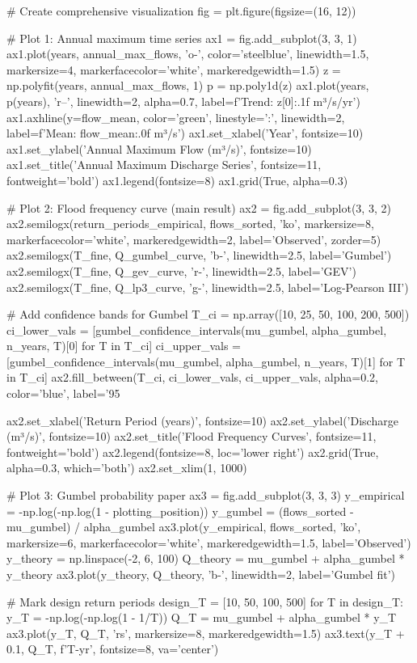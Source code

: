 \documentclass[a4paper, 11pt]{article}
\begin{document}
\begin{pycode}
# Create comprehensive visualization
fig = plt.figure(figsize=(16, 12))

# Plot 1: Annual maximum time series
ax1 = fig.add_subplot(3, 3, 1)
ax1.plot(years, annual_max_flows, 'o-', color='steelblue', linewidth=1.5,
         markersize=4, markerfacecolor='white', markeredgewidth=1.5)
z = np.polyfit(years, annual_max_flows, 1)
p = np.poly1d(z)
ax1.plot(years, p(years), 'r--', linewidth=2, alpha=0.7, label=f'Trend: {z[0]:.1f} m³/s/yr')
ax1.axhline(y=flow_mean, color='green', linestyle=':', linewidth=2, label=f'Mean: {flow_mean:.0f} m³/s')
ax1.set_xlabel('Year', fontsize=10)
ax1.set_ylabel('Annual Maximum Flow (m³/s)', fontsize=10)
ax1.set_title('Annual Maximum Discharge Series', fontsize=11, fontweight='bold')
ax1.legend(fontsize=8)
ax1.grid(True, alpha=0.3)

# Plot 2: Flood frequency curve (main result)
ax2 = fig.add_subplot(3, 3, 2)
ax2.semilogx(return_periods_empirical, flows_sorted, 'ko', markersize=8,
             markerfacecolor='white', markeredgewidth=2, label='Observed', zorder=5)
ax2.semilogx(T_fine, Q_gumbel_curve, 'b-', linewidth=2.5, label='Gumbel')
ax2.semilogx(T_fine, Q_gev_curve, 'r-', linewidth=2.5, label='GEV')
ax2.semilogx(T_fine, Q_lp3_curve, 'g-', linewidth=2.5, label='Log-Pearson III')

# Add confidence bands for Gumbel
T_ci = np.array([10, 25, 50, 100, 200, 500])
ci_lower_vals = [gumbel_confidence_intervals(mu_gumbel, alpha_gumbel, n_years, T)[0] for T in T_ci]
ci_upper_vals = [gumbel_confidence_intervals(mu_gumbel, alpha_gumbel, n_years, T)[1] for T in T_ci]
ax2.fill_between(T_ci, ci_lower_vals, ci_upper_vals, alpha=0.2, color='blue', label='95%

ax2.set_xlabel('Return Period (years)', fontsize=10)
ax2.set_ylabel('Discharge (m³/s)', fontsize=10)
ax2.set_title('Flood Frequency Curves', fontsize=11, fontweight='bold')
ax2.legend(fontsize=8, loc='lower right')
ax2.grid(True, alpha=0.3, which='both')
ax2.set_xlim(1, 1000)

# Plot 3: Gumbel probability paper
ax3 = fig.add_subplot(3, 3, 3)
y_empirical = -np.log(-np.log(1 - plotting_position))
y_gumbel = (flows_sorted - mu_gumbel) / alpha_gumbel
ax3.plot(y_empirical, flows_sorted, 'ko', markersize=6, markerfacecolor='white',
         markeredgewidth=1.5, label='Observed')
y_theory = np.linspace(-2, 6, 100)
Q_theory = mu_gumbel + alpha_gumbel * y_theory
ax3.plot(y_theory, Q_theory, 'b-', linewidth=2, label='Gumbel fit')

# Mark design return periods
design_T = [10, 50, 100, 500]
for T in design_T:
    y_T = -np.log(-np.log(1 - 1/T))
    Q_T = mu_gumbel + alpha_gumbel * y_T
    ax3.plot(y_T, Q_T, 'rs', markersize=8, markeredgewidth=1.5)
    ax3.text(y_T + 0.1, Q_T, f'{T}-yr', fontsize=8, va='center')


\end{pycode}
\end{document}
